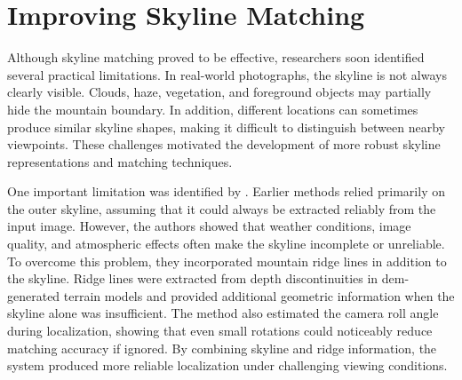 %
%
%

\section{Improving Skyline Matching}

Although skyline matching proved to be effective, researchers soon identified several practical limitations. In real-world photographs, the skyline is not always clearly visible. Clouds, haze, vegetation, and foreground objects may partially hide the mountain boundary. In addition, different locations can sometimes produce similar skyline shapes, making it difficult to distinguish between nearby viewpoints. These challenges motivated the development of more robust skyline representations and matching techniques.

One important limitation was identified by \cite{chen2015camera}. Earlier methods relied primarily on the outer skyline, assuming that it could always be extracted reliably from the input image. However, the authors showed that weather conditions, image quality, and atmospheric effects often make the skyline incomplete or unreliable. To overcome this problem, they incorporated mountain ridge lines in addition to the skyline. Ridge lines were extracted from depth discontinuities in \Gls{dem}-generated terrain models and provided additional geometric information when the skyline alone was insufficient. The method also estimated the camera roll angle during localization, showing that even small rotations could noticeably reduce matching accuracy if ignored. By combining skyline and ridge information, the system produced more reliable localization under challenging viewing conditions.

